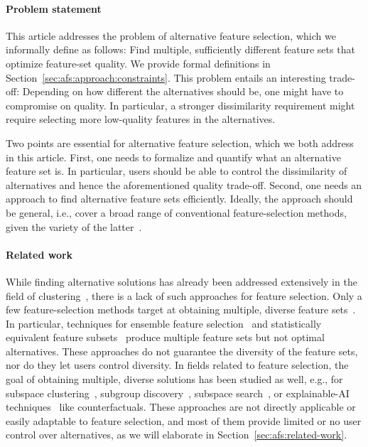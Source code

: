 \documentclass{article}
\theoremstyle{definition}
\begin{document}
\paragraph{Problem statement}

This article addresses the problem of alternative feature selection, which we informally define as follows:
Find multiple, sufficiently different feature sets that optimize feature-set quality.
We provide formal definitions in Section~\ref{sec:afs:approach:constraints}.
This problem entails an interesting trade-off:
Depending on how different the alternatives should be, one might have to compromise on quality.
In particular, a stronger dissimilarity requirement might require selecting more low-quality features in the alternatives.

Two points are essential for alternative feature selection, which we both address in this article.
First, one needs to formalize and quantify what an alternative feature set is.
In particular, users should be able to control the dissimilarity of alternatives and hence the aforementioned quality trade-off.
Second, one needs an approach to find alternative feature sets efficiently.
Ideally, the approach should be general, i.e., cover a broad range of conventional feature-selection methods, given the variety of the latter~\cite{chandrashekar2014survey, li2017feature}.

\paragraph{Related work}

While finding alternative solutions has already been addressed extensively in the field of clustering~\cite{bailey2014alternative}, there is a lack of such approaches for feature selection.
Only a few feature-selection methods target at obtaining multiple, diverse feature sets~\cite{borboudakis2021extending}.
In particular, techniques for ensemble feature selection~\cite{saeys2008robust, seijo2017ensemble} and statistically equivalent feature subsets~\cite{lagani2017feature} produce multiple feature sets but not optimal alternatives.
These approaches do not guarantee the diversity of the feature sets, nor do they let users control diversity.
In fields related to feature selection, the goal of obtaining multiple, diverse solutions has been studied as well, e.g., for subspace clustering~\cite{hu2018subspace, mueller2009relevant}, subgroup discovery~\cite{leeuwen2012diverse}, subspace search~\cite{trittenbach2019dimension}, or explainable-AI techniques~\cite{artelt2022even, kim2016examples, mothilal2020explaining, russell2019efficient} like counterfactuals.
These approaches are not directly applicable or easily adaptable to feature selection, and most of them provide limited or no user control over alternatives, as we will elaborate in Section~\ref{sec:afs:related-work}.
\end{document}
